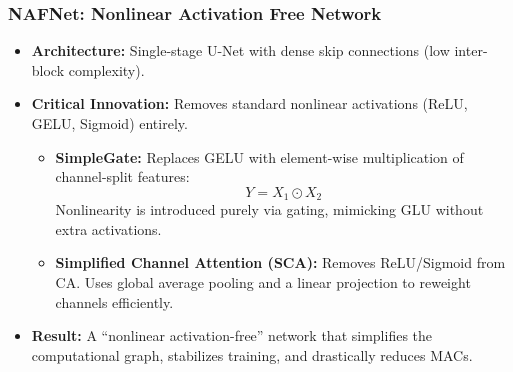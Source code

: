 \documentclass[aspectratio=169,xcolor=dvipsnames]{beamer}
\begin{document}
    \begin{frame}
        \frametitle{NAFNet: Nonlinear Activation Free Network}
        \begin{itemize}
            \item \textbf{Architecture:} Single-stage U-Net with dense skip connections (low inter-block complexity).
            \item \textbf{Critical Innovation:} Removes standard nonlinear activations (ReLU, GELU, Sigmoid) entirely.
            \begin{itemize}
                \item \textbf{SimpleGate:} Replaces GELU with element-wise multiplication of channel-split features: 
                \[ Y = X_1 \odot X_2 \]
                Nonlinearity is introduced purely via gating, mimicking GLU without extra activations.
                \item \textbf{Simplified Channel Attention (SCA):} Removes ReLU/Sigmoid from CA. Uses global average pooling and a linear projection to reweight channels efficiently.
            \end{itemize}
            \item \textbf{Result:} A ``nonlinear activation-free'' network that simplifies the computational graph, stabilizes training, and drastically reduces MACs.
        \end{itemize}
    \end{frame}
\end{document}
